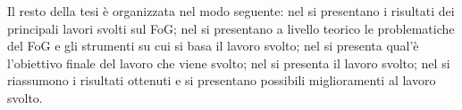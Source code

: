 
Il resto della tesi è organizzata nel modo seguente: nel \textbf{} si presentano i risultati dei principali lavori svolti sul FoG; nel \textbf{} si presentano a livello teorico le problematiche del FoG e gli strumenti su cui si basa il lavoro svolto; nel \textbf{} si presenta qual'è l'obiettivo finale del lavoro che viene svolto; nel \textbf{} si presenta il lavoro svolto; nel \textbf{} si riassumono i risultati ottenuti e si presentano possibili miglioramenti al lavoro svolto.
 